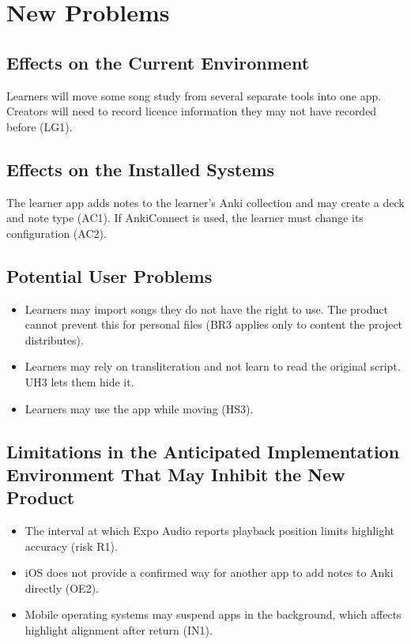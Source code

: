 \documentclass[12pt]{article}
\begin{document}
\section{New Problems}
\subsection{Effects on the Current Environment}
Learners will move some song study from several separate tools into one app.
Creators will need to record licence information they may not have recorded
before (LG1).

\subsection{Effects on the Installed Systems}
The learner app adds notes to the learner's Anki collection and may create a
\progname{} deck and note type (AC1). If AnkiConnect is used, the learner must
change its configuration (AC2).

\subsection{Potential User Problems}
\begin{itemize}
    \item Learners may import songs they do not have the right to use. The
          product cannot prevent this for personal files (BR3 applies only to
          content the project distributes).
    \item Learners may rely on transliteration and not learn to read the
          original script. UH3 lets them hide it.
    \item Learners may use the app while moving (HS3).
\end{itemize}

\subsection{Limitations in the Anticipated Implementation Environment That May
Inhibit the New Product}
\begin{itemize}
    \item The interval at which Expo Audio reports playback position limits
          highlight accuracy (risk R1).
    \item iOS does not provide a confirmed way for another app to add notes to
          Anki directly (OE2).
    \item Mobile operating systems may suspend apps in the background, which
          affects highlight alignment after return (IN1).
\end{itemize}
\end{document}
